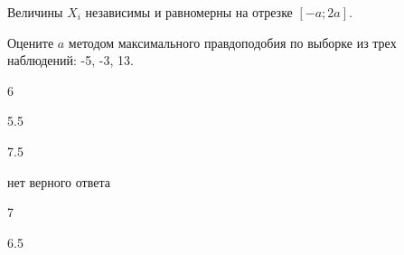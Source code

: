 
\begin{question}
Величины \(X_i\) независимы и равномерны на отрезке \([-a;2a]\).

Оцените \(a\) методом максимального правдоподобия по выборке из трех
наблюдений: -5, -3, 13.
\begin{answerlist}
  \item 6
  \item 5.5
  \item 7.5
  \item нет верного ответа
  \item 7
  \item 6.5
\end{answerlist}
\end{question}


